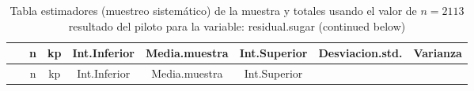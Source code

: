 \documentclass[
]{article}
\begin{document}
\begin{longtable}[]{@{}cccccccc@{}}
\caption{Tabla estimadores (muestreo sistemático) de la muestra y
totales usando el valor de \(n = 2113\) resultado del piloto para la
variable: residual.sugar (continued below)}\tabularnewline
\toprule
\begin{minipage}[b]{0.18\columnwidth}\centering
~\strut
\end{minipage} & \begin{minipage}[b]{0.05\columnwidth}\centering
n\strut
\end{minipage} & \begin{minipage}[b]{0.03\columnwidth}\centering
kp\strut
\end{minipage} & \begin{minipage}[b]{0.10\columnwidth}\centering
Int.Inferior\strut
\end{minipage} & \begin{minipage}[b]{0.11\columnwidth}\centering
Media.muestra\strut
\end{minipage} & \begin{minipage}[b]{0.10\columnwidth}\centering
Int.Superior\strut
\end{minipage} & \begin{minipage}[b]{0.12\columnwidth}\centering
Desviacion.std.\strut
\end{minipage} & \begin{minipage}[b]{0.08\columnwidth}\centering
Varianza\strut
\end{minipage}\tabularnewline
\midrule
\endfirsthead
\toprule
\begin{minipage}[b]{0.18\columnwidth}\centering
~\strut
\end{minipage} & \begin{minipage}[b]{0.05\columnwidth}\centering
n\strut
\end{minipage} & \begin{minipage}[b]{0.03\columnwidth}\centering
kp\strut
\end{minipage} & \begin{minipage}[b]{0.10\columnwidth}\centering
Int.Inferior\strut
\end{minipage} & \begin{minipage}[b]{0.11\columnwidth}\centering
Media.muestra\strut
\end{minipage} & \begin{minipage}[b]{0.10\columnwidth}\centering
Int.Superior\strut
\end{minipage} & \begin{minipage}[b]{0.12\columnwidth}\centering

\end{minipage}
\end{longtable}
\end{document}

